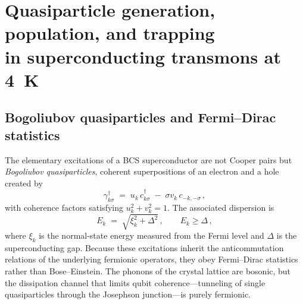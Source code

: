 %
%
%   
%

\chapter[Quasiparticle generation, population, and trapping]%
        {Quasiparticle generation, population, and trapping\\
         in superconducting transmons at \SI{4}{\kelvin}}
\label{app:qp}

\providecommand{\xqp}{x_{\rm qp}}
\providecommand{\xqpth}{x_{\rm qp}^{\rm th}}
\providecommand{\kBb}{k_{\rm B}}
\providecommand{\Eone}{E_{J1}}
\providecommand{\Etwo}{E_{J2}}

\section{Bogoliubov quasiparticles and Fermi--Dirac statistics}
\label{app:qp:bogoliubov}

The elementary excitations of a BCS superconductor are not Cooper pairs but
\emph{Bogoliubov quasiparticles}, coherent superpositions of an electron and a
hole created by
\begin{equation}
  \gamma^\dagger_{k\sigma}
   \;=\; u_k\, c^\dagger_{k\sigma} \;-\; \sigma v_k\, c_{-k,-\sigma}\,,
  \label{app:qp:eq:bogoliubov}
\end{equation}
with coherence factors satisfying $u_k^2 + v_k^2 = 1$.  The associated
dispersion is
\begin{equation}
  E_k \;=\; \sqrt{\xi_k^2 + \Delta^2}\,,\qquad E_k \geq \Delta\,,
  \label{app:qp:eq:bcs-dispersion}
\end{equation}
where $\xi_k$ is the normal-state energy measured from the Fermi level and
$\Delta$ is the superconducting gap.  Because these excitations inherit the
anticommutation relations of the underlying fermionic operators, they obey
Fermi--Dirac statistics rather than Bose--Einstein.  The phonons of the
crystal lattice are bosonic, but the dissipation channel that limits qubit
coherence---tunneling of single quasiparticles through the Josephson
junction---is purely fermionic.

